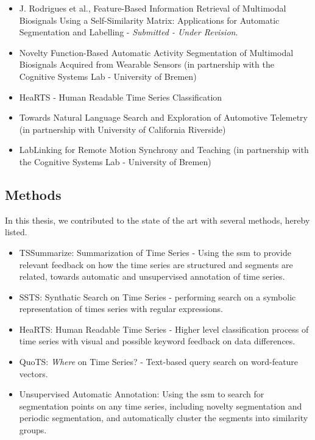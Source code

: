 \begin{itemize}
\item J. Rodrigues et al., Feature-Based Information Retrieval of Multimodal Biosignals Using a Self-Similarity Matrix: Applications for Automatic Segmentation and Labelling - \textit{Submitted - Under Revision}.

\item Novelty Function-Based Automatic Activity Segmentation of Multimodal Biosignals Acquired from Wearable Sensors (in partnership with the Cognitive Systems Lab - University of Bremen)

\item HeaRTS - Human Readable Time Series Classification

\item Towards Natural Language Search and Exploration of Automotive Telemetry (in partnership with University of California Riverside)

\item LabLinking for Remote Motion Synchrony and Teaching (in partnership with the Cognitive Systems Lab - University of Bremen)

\end{itemize}

\subsection{Methods}

In this thesis, we contributed to the state of the art with several methods, hereby listed.

\begin{itemize}

\item TSSummarize: Summarization of Time Series - Using the \gls{ssm} to provide relevant feedback on how the time series are structured and segments are related, towards automatic and unsupervised annotation of time series.

\item SSTS: Synthatic Search on Time Series - performing search on a symbolic representation of times series with regular expressions.

\item HeaRTS: Human Readable Time Series - Higher level classification process of time series with visual and possible keyword feedback on data differences.

\item QuoTS: \textit{Where} on Time Series? - Text-based query search on word-feature vectors. 

\item Unsupervised Automatic Annotation: Using the \gls{ssm} to search for segmentation points on any time series, including novelty segmentation and periodic segmentation, and automatically cluster the segments into similarity groups.

\end{itemize}

